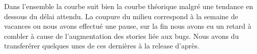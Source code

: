 Dans l’ensemble la courbe suit bien la courbe théorique malgré une tendance en dessous du délai attendu. La coupure du milieu correspond à la semaine de vacances ou nous avons effectué une pause, sur la fin nous avons eu un retard à combler à cause de l’augmentation des stories liée aux bugs. Nous avons du transferérer quelques unes de ces dernières à la release d’après.